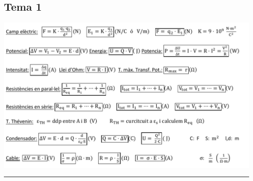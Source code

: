 \documentclass[12pt]{article}
\begin{document}
\raggedright
\begin{multicols}{2}

\subsection*{Tema 1}
\includegraphics[width=\linewidth]{Auxiliar/t1.pdf}
\noindent\rule{\linewidth}{1pt}

\end{multicols}
\end{document}
